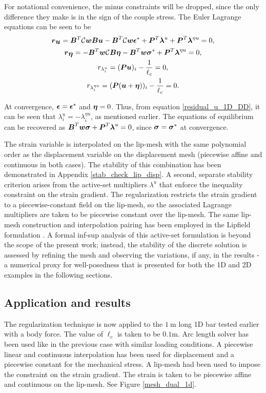 \documentclass[10pt]{cas-sc}
\newenvironment{addedblock}{}{}
\begin{document}
For notational convenience, the minus constraints will be dropped, since the only difference they make is in the sign of the couple stress. The Euler Lagrange equations can be seen to be
\begin{gather}
	\mbox{\boldmath $r$}_{\mbox{\boldmath $u$}} = \mbox{\boldmath $B$}^T \mathcal{C}\mbox{\boldmath $w$} \mbox{\boldmath $B$} \mbox{\boldmath $u$} - \mbox{\boldmath $B$}^T \mathcal{C}\mbox{\boldmath $w$} \mbox{\boldmath $\epsilon$} ^* + \mbox{\boldmath $P$}^T \mbox{\boldmath $\lambda$}^u +\mbox{\boldmath $P$}^T \mbox{\boldmath $\lambda$}^{\eta u}  =0, \label{residual_u_1D_DD} \\
	\mbox{\boldmath $r$}_{\mbox{\boldmath $\eta$}} = -\mbox{\boldmath $B$}^T\mbox{\boldmath $w$} \mathcal{C} \mbox{\boldmath $B$} \mbox{\boldmath $\eta$} - \mbox{\boldmath $B$}^T\mbox{\boldmath $w$} \mbox{\boldmath $\sigma$} ^* +\mbox{\boldmath $P$}^T \mbox{\boldmath $\lambda$}^{\eta u} =0, \\
	r_{\lambda^u_i} =  (\mbox{\boldmath $P$} \mbox{\boldmath $u$})_i - \frac{1}{\ell_c}  =0, \\
	r_{\lambda^{\eta u}_i} =  (\mbox{\boldmath $P$} (\mbox{\boldmath $u$} + \mbox{\boldmath $\eta$}))_i - \frac{1}{\ell_c}  =0. 
\end{gather}

At convergence, $\mbox{\boldmath $\epsilon$}=\mbox{\boldmath $\epsilon$}^*$ and $\mbox{\boldmath $\eta$}=0$. Thus, from equation \ref{residual_u_1D_DD}, it can be seen that $\lambda^u_i = -\lambda^{\eta u}_i$, as mentioned earlier. The equations of equilibrium can be recovered as $\mbox{\boldmath $B$}^T \mbox{\boldmath $w$} \mbox{\boldmath $\sigma$} +\mbox{\boldmath $P$}^T \mbox{\boldmath $\lambda$}^{u} =0$, since $\mbox{\boldmath $\sigma$} = \mbox{\boldmath $\sigma$}^*$ at convergence.


\begin{addedblock}
The strain variable is interpolated on the lip-mesh with the same polynomial order as the displacement variable on the displacement mesh (piecewise affine and continuous in both cases). The stability of this combination has been demonstrated in Appendix \ref{stab_check_lip_disp}. A second, separate stability criterion arises from the active-set multipliers $\lambda^u$ that enforce the inequality constraint on the strain gradient. The regularization restricts the strain gradient to a piecewise-constant field on the lip-mesh, so the associated Lagrange multipliers are taken to be piecewise constant over the lip-mesh. The same lip-mesh construction and interpolation pairing has been employed in the Lipfield formulation \cite{Chevaugeon2021}. A formal inf-sup analysis of this active-set formulation is beyond the scope of the present work; instead, the stability of the discrete solution is assessed by refining the mesh and observing the variations, if any, in the results - a numerical proxy for well-posedness that is presented for both the 1D and 2D examples in the following sections.
\end{addedblock}

\subsection{Application and results}
The regularization technique is now applied to the $\SI{1}{\meter}$ long 1D bar tested earlier with a body force. The value of $\ell_c$ is taken to be $0.1\si{\meter}$. Arc length solver has been used like in the previous case with similar loading conditions. A piecewise linear and continuous interpolation has been used for displacement and a piecewise constant for the mechanical stress. A lip-mesh had been used to impose the constraint on the strain gradient. The strain is taken to be piecewise affine and continuous on the lip-mesh. See Figure \ref{mesh_dual_1d}. 
\end{document}
